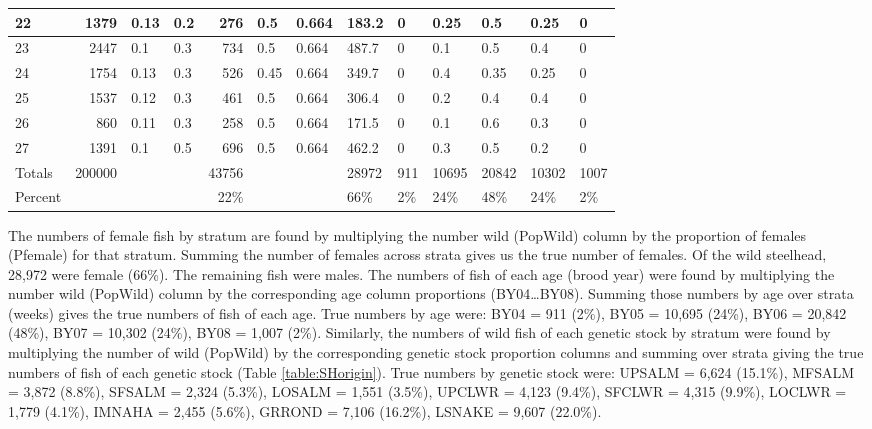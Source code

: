 \documentclass[11pt]{article}
\begin{document}
\begin{sidewaystable}
\begin{tabular}{ | l | r | l | l | r | l | l | l | l |l | l | l | l | }
22&1379&0.13&0.2&276&0.5&0.664&183.2&0&0.25&0.5&0.25&0 \\ \hline
23&2447&0.1&0.3&734&0.5&0.664&487.7&0&0.1&0.5&0.4&0 \\ \hline
24&1754&0.13&0.3&526&0.45&0.664&349.7&0&0.4&0.35&0.25&0 \\ \hline
25&1537&0.12&0.3&461&0.5&0.664&306.4&0&0.2&0.4&0.4&0 \\ \hline
26&860&0.11&0.3&258&0.5&0.664&171.5&0&0.1&0.6&0.3&0 \\ \hline
27&1391&0.1&0.5&696&0.5&0.664&462.2&0&0.3&0.5&0.2&0 \\ \hline
Totals&200000&&&43756&&&28972&911&10695&20842&10302&1007 \\ \hline
Percent&&&&22\%&&&66\%&2\%&24\%&48\%&24\%&2\% \\ \hline
\end{tabular}
\end{sidewaystable}

The numbers of female fish by stratum are found by multiplying the number wild (PopWild) column by the proportion of females (Pfemale) for that stratum. Summing the number of females across strata gives us the true number of females. Of the wild steelhead, 28,972 were female (66\%). The remaining fish were males. The numbers of fish of each age (brood year) were found by multiplying the number wild (PopWild) column by the corresponding age column proportions (BY04\ldots BY08). Summing those numbers by age over strata (weeks) gives the true numbers of fish of each age. True numbers by age were: BY04 = 911 (2\%), BY05 = 10,695 (24\%), BY06 = 20,842 (48\%), BY07 = 10,302 (24\%), BY08 = 1,007 (2\%). Similarly, the numbers of wild fish of each genetic stock by stratum were found by multiplying the number of wild (PopWild) by the corresponding genetic stock proportion columns and summing over strata giving the true numbers of fish of each genetic stock (Table \ref{table:SHorigin}). True numbers by genetic stock were: UPSALM = 6,624 (15.1\%), MFSALM = 3,872 (8.8\%), SFSALM = 2,324 (5.3\%), LOSALM = 1,551 (3.5\%), UPCLWR = 4,123 (9.4\%), SFCLWR = 4,315 (9.9\%), LOCLWR = 1,779 (4.1\%), IMNAHA = 2,455 (5.6\%), GRROND = 7,106 (16.2\%), LSNAKE = 9,607 (22.0\%).
\end{document}
